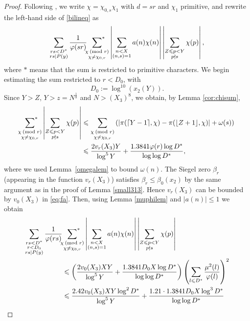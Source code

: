 \documentclass[12pt]{amsart}
\begin{document}
\begin{proof}
Following \cite[\S 10.7]{Nathanson}, we write $\chi=\chi_{0,s} \chi_1$ with $d=sr$ and $\chi_1$ primitive, and rewrite the left-hand side of \eqref{bilineq} as
\begin{align}
\label{eq:rs}
\sum_{\substack{rs<D^*\\ rs\mid P(y)}} \frac{1}{\varphi(sr)}\sideset{}{^{*}}\sum_{\substack{\chi\: (\text{mod }r)\\ \chi\neq \chi_{0,r}}}\left|\sum_{\substack{n<X\\ (n,s)=1}}a(n) \chi(n) \right|\left|\sum_{\substack{Z\le p <Y \\ p\nmid s}}\chi(p) \right|,
\end{align}
where $*$ means that the sum is restricted to primitive characters. We begin estimating the sum restricted to $r<D_0$, with 
\begin{equation}\label{def-D_0}
    D_0:=\log^{10} (x_2(Y)).
\end{equation} 
Since $Y>Z$, $Y>z=N^{\frac{1}{8}}$ and $N> (X_3)^8$, we obtain, by Lemma \ref{cor:chisum}, 
\begin{align}
\label{eq:fa}
\begin{split}
\sideset{}{^{*}}\sum_{\substack{\chi\: (\text{mod }r)\\\chi\neq\chi_{0,r}}}\left|\sum_{\substack{Z\le p <Y \\ p\nmid s}}\chi(p) \right|&\le \sum_{\substack{\chi\: (\text{mod }r)\\\chi\neq\chi_{0,r}}}\left(\left| \pi(\lceil Y-1\rceil,\chi)-\pi(\lfloor Z+1\rfloor,\chi)\right|+\omega(s) \right)
\\ & \le \frac{2v_r(X_3)Y}{\log^5 Y}+\frac{1.3841\varphi(r) \log D^*}{\log \log D^*},
\end{split}
\end{align}
where we used Lemma~\ref{omegalem} to bound $\omega(n)$. The Siegel zero $\beta_r$ (appearing in the function $v_r(X_3)$) satisfies $\beta_r\le \beta_0(x_2)$ by the same argument as in the proof of Lemma \ref{small313}. Hence $v_r(X_3)$ can be bounded by $v_0(X_3)$ in \eqref{eq:fa}. Then, using Lemma \ref{muphilem} and $|a(n)| \le 1$ we obtain
\begin{align}
\label{eq:rs1}
\sum_{\substack{rs<D^*\\ r <D_0\\rs\mid P(y)}}\frac{1}{\varphi(rs)}&\sideset{}{^{*}}\sum_{\substack{\chi\: (\text{mod }r)\\\chi\neq\chi_{0,r}}}\left|\sum_{\substack{n<X\\ (n,s)=1}}a(n) \chi(n) \right|\left|\sum_{\substack{Z\le p <Y \\ p\nmid s}}\chi(p) \right| \notag\\ & \le \left(\frac{2v_0(X_3)XY}{\log^5 Y} +\frac{ 1.3841D_0X\log D^*}{\log \log D^*}\right) \left(\sum_{l\le D^*}\frac{\mu^2(l)}{\varphi(l)}\right)^2\notag\\ & \le \frac{2.42v_0(X_3)XY \log^2 D^* }{\log^5 Y} +\frac{1.21\cdot1.3841D_0X\log^3 D^*}{\log \log D^*}\notag\\

\end{align}
\end{proof}
\end{document}
